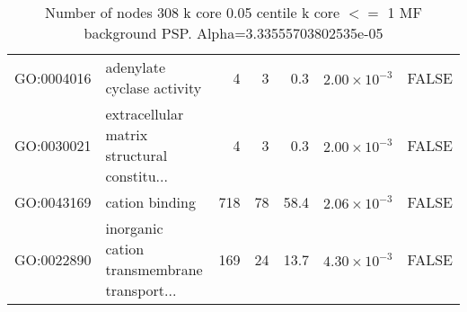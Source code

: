 \begin{table}[ht]
\begin{tabular}{llrrrrl}
  GO:0004016 & adenylate cyclase activity & 4 & 3 & 0.3 & $2.00 \times 10^{-3}$ & FALSE \\ 
  GO:0030021 & extracellular matrix structural constitu... & 4 & 3 & 0.3 & $2.00 \times 10^{-3}$ & FALSE \\ 
  GO:0043169 & cation binding & 718 & 78 & 58.4 & $2.06 \times 10^{-3}$ & FALSE \\ 
  GO:0022890 & inorganic cation transmembrane transport... & 169 & 24 & 13.7 & $4.30 \times 10^{-3}$ & FALSE \\ 
   \hline
\end{tabular}
\caption{Number of nodes 308 k core 0.05 centile  k core $<=$ 1 MF background PSP. Alpha=3.33555703802535e-05} 
\label{tab:Number of nodes 308 k core 0.05 centile  k core $<=$ 1 MF background PSP. Alpha=3.33555703802535e-05}
\end{table}


